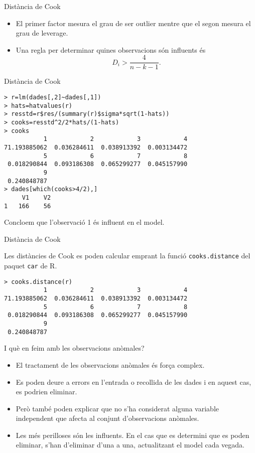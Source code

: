 \documentclass[12pt,t]{beamer}
\theoremstyle{plain}
\theoremstyle{definition}
\begin{document}
\begin{frame}{Distància de Cook}
\begin{itemize}
\item El primer factor mesura el grau de ser outlier mentre que el segon mesura el grau de leverage.
\item Una regla per determinar quines observacions són influents és
$$D_i>\frac{4}{n-k-1}.$$
\end{itemize}
\end{frame}

\begin{frame}[fragile]{Distància de Cook}
\begin{footnotesize}


\begin{verbatim}
> r=lm(dades[,2]~dades[,1])
> hats=hatvalues(r)
> resstd=r$res/(summary(r)$sigma*sqrt(1-hats))
> cooks=resstd^2/2*hats/(1-hats)
> cooks
           1            2            3            4   
71.193885062  0.036284611  0.038913392  0.003134472  
           5            6            7            8   
 0.018290844  0.093186308  0.065299277  0.045157990 
           9
 0.240848787
> dades[which(cooks>4/2),]
     V1    V2
1   166    56
\end{verbatim}
\end{footnotesize}
Concloem que l'observació 1 és influent en el model.
\end{frame}

\begin{frame}[fragile]{Distància de Cook}

Les distàncies de Cook es poden calcular emprant la funció \texttt{cooks.distance} del paquet \texttt{car} de R. 
\begin{footnotesize}
\begin{verbatim}
> cooks.distance(r)
           1            2            3            4   
71.193885062  0.036284611  0.038913392  0.003134472  
           5            6            7            8   
 0.018290844  0.093186308  0.065299277  0.045157990 
           9
 0.240848787
\end{verbatim}
\end{footnotesize}
\end{frame}

\begin{frame}{I què en feim amb les observacions anòmales?}
\begin{itemize}
\item El tractament de les observacions anòmales és força complex.
\item Es poden deure a errors en l'entrada o recollida de les dades i en aquest cas, es podrien eliminar.
\item Però també poden explicar que no s'ha considerat alguna variable independent que afecta al conjunt d'observacions anòmales.
\item Les més perilloses són les influents. En el cas que es determini que es poden eliminar, s'han d'eliminar d'una a una, actualitzant el model cada vegada.
\end{itemize}


\end{frame}
\end{document}
